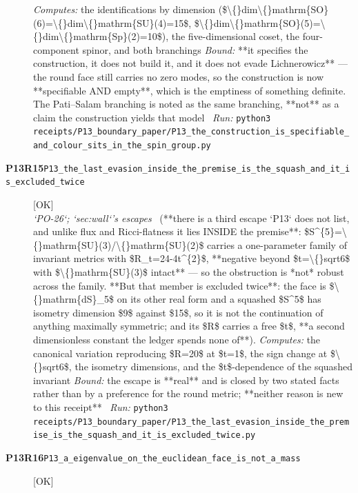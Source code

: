 \begin{description}
\emph{Computes:} the identifications by dimension (\$\textbackslash\{\}dim\textbackslash\{\}mathrm\{SO\}(6)=\textbackslash\{\}dim\textbackslash\{\}mathrm\{SU\}(4)=15\$, \$\textbackslash\{\}dim\textbackslash\{\}mathrm\{SO\}(5)=\textbackslash\{\}dim\textbackslash\{\}mathrm\{Sp\}(2)=10\$), the five-dimensional coset, the four-component spinor, and both branchings
 \emph{Bound:}  **it specifies the construction, it does not build it, and it does not evade Lichnerowicz** --- the round face still carries no zero modes, so the construction is now **specifiable AND empty**, which is the emptiness of something definite. The Pati--Salam branching is noted as the same branching, **not** as a claim the construction yields that model
\ \emph{Run:} \texttt{python3 receipts/P13\_boundary\_paper/P13\_the\_construction\_is\_specifiable\_and\_colour\_sits\_in\_the\_spin\_group.py}
\item[\rcptlabel{P13_the_last_evasion_inside_the_premise_is_the_squash_and_it_is_excluded_twice}{P13R15}\textbf{P13R15}\quad\texttt{P13\_the\_last\_evasion\_inside\_the\_premise\_is\_the\_squash\_and\_it\_is\_excluded\_twice}]\hfill\textsf{[OK]}\\
\textit{`PO-26`; `sec:wall`'s escapes} \ (**there is a third escape `P13` does not list, and unlike flux and Ricci-flatness it lies INSIDE the premise**: \$S\textasciicircum{}\{5\}=\textbackslash\{\}mathrm\{SU\}(3)/\textbackslash\{\}mathrm\{SU\}(2)\$ carries a one-parameter family of invariant metrics with \$R\_t=24-4t\textasciicircum{}\{2\}\$, **negative beyond \$t=\textbackslash\{\}sqrt6\$ with \$\textbackslash\{\}mathrm\{SU\}(3)\$ intact** --- so the obstruction is *not* robust across the family. **But that member is excluded twice**: the face is \$\textbackslash\{\}mathrm\{dS\}\_5\$ on its other real form and a squashed \$S\textasciicircum{}5\$ has isometry dimension \$9\$ against \$15\$, so it is not the continuation of anything maximally symmetric; and its \$R\$ carries a free \$t\$, **a second dimensionless constant the ledger spends none of**). 
\emph{Computes:} the canonical variation reproducing \$R=20\$ at \$t=1\$, the sign change at \$\textbackslash\{\}sqrt6\$, the isometry dimensions, and the \$t\$-dependence of the squashed invariant
 \emph{Bound:} the escape is **real** and is closed by two stated facts rather than by a preference for the round metric; **neither reason is new to this receipt**
\ \emph{Run:} \texttt{python3 receipts/P13\_boundary\_paper/P13\_the\_last\_evasion\_inside\_the\_premise\_is\_the\_squash\_and\_it\_is\_excluded\_twice.py}
\item[\rcptlabel{P13_a_eigenvalue_on_the_euclidean_face_is_not_a_mass}{P13R16}\textbf{P13R16}\quad\texttt{P13\_a\_eigenvalue\_on\_the\_euclidean\_face\_is\_not\_a\_mass}]\hfill\textsf{[OK]}\\

\end{description}
